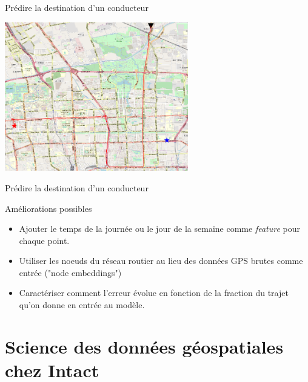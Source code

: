 \documentclass[aspectratio=169]{beamer}
\begin{document}
\begin{frame}{Prédire la destination d'un conducteur}
\centering

\includegraphics[width=0.6\textwidth]{figures/ex4_clf}
\end{frame}

\begin{frame}{Prédire la destination d'un conducteur}

{\Large Améliorations possibles}

\vspace{.5cm}
\begin{itemize}
	\item Ajouter le temps de la journée ou le jour de la semaine comme \textit{feature} pour chaque point.
	\item Utiliser les noeuds du réseau routier au lieu des données GPS brutes comme entrée ("node embeddings")
	\item Caractériser comment l'erreur évolue en fonction de la fraction du trajet qu'on donne en entrée au modèle.
\end{itemize}

\end{frame}


\section{Science des données géospatiales chez  Intact}
\end{document}
